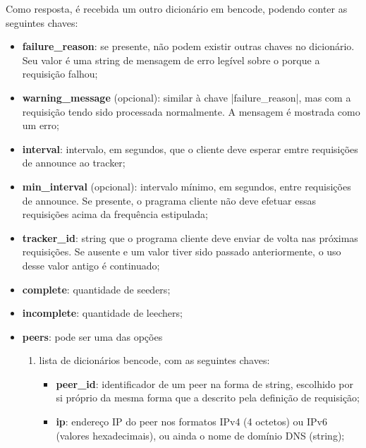 Como resposta, é recebida um outro dicionário em \gls*{bencode}, podendo conter as
seguintes chaves:

\begin{itemize}
    \item \textbf{failure\_reason}: se presente, não podem existir outras chaves no
    dicionário. Seu valor é uma \gls*{string} de mensagem de erro legível sobre o
    porque a requisição falhou;

    \item \textbf{warning\_message} (opcional): similar à chave
    \bverb|failure\_reason|, mas com a requisição tendo sido processada normalmente. A
    mensagem é mostrada como um erro;

    \item \textbf{interval}: intervalo, em segundos, que o cliente deve esperar emtre
    requisições de \gls*{announce} ao \gls*{tracker};

    \item \textbf{min\_interval} (opcional): intervalo mínimo, em segundos, entre
    requisições de \gls*{announce}. Se presente, o pragrama cliente não deve efetuar
    essas requisições acima da frequência estipulada;

    \item \textbf{tracker\_id}: \gls*{string} que o programa cliente deve enviar de
    volta nas próximas requisições. Se ausente e um valor tiver sido passado
    anteriormente, o uso desse valor antigo é continuado;

    \item \textbf{complete}: quantidade de \glspl*{seeder};

    \item \textbf{incomplete}: quantidade de \glspl*{leecher};

    \item \textbf{peers}: pode ser uma das opções

    \begin{enumerate}
        \item lista de dicionários \gls*{bencode}, com as seguintes chaves:

        \begin{itemize}
            \item \textbf{peer\_id}: identificador de um \gls*{peer} na forma de
            \gls*{string}, escolhido por si próprio da mesma forma que a descrito pela
            definição de requisição;

            \item \textbf{ip}: endereço IP do \gls*{peer} nos formatos IPv4 (4 octetos)
            ou IPv6 (valores hexadecimais), ou ainda o nome de domínio DNS (string);


\end{itemize}
\end{enumerate}
\end{itemize}
